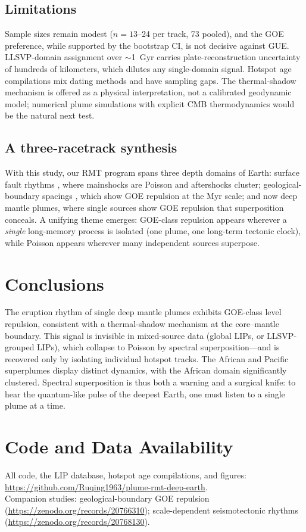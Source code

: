 \documentclass[12pt,a4paper]{article}
\begin{document}
\subsection{Limitations}
Sample sizes remain modest ($n=13$--24 per track, 73 pooled), and the GOE preference, while supported by the bootstrap CI, is not decisive against GUE. LLSVP-domain assignment over $\sim$1~Gyr carries plate-reconstruction uncertainty of hundreds of kilometers, which dilutes any single-domain signal. Hotspot age compilations mix dating methods and have sampling gaps. The thermal-shadow mechanism is offered as a physical interpretation, not a calibrated geodynamic model; numerical plume simulations with explicit CMB thermodynamics would be the natural next test.

\subsection{A three-racetrack synthesis}
With this study, our RMT program spans three depth domains of Earth: surface fault rhythms \citep{chen2026fault}, where mainshocks are Poisson and aftershocks cluster; geological-boundary spacings \citep{chen2026geo}, which show GOE repulsion at the Myr scale; and now deep mantle plumes, where single sources show GOE repulsion that superposition conceals. A unifying theme emerges: GOE-class repulsion appears wherever a \emph{single} long-memory process is isolated (one plume, one long-term tectonic clock), while Poisson appears wherever many independent sources superpose.

\section{Conclusions}
The eruption rhythm of single deep mantle plumes exhibits GOE-class level repulsion, consistent with a thermal-shadow mechanism at the core--mantle boundary. This signal is invisible in mixed-source data (global LIPs, or LLSVP-grouped LIPs), which collapse to Poisson by spectral superposition---and is recovered only by isolating individual hotspot tracks. The African and Pacific superplumes display distinct dynamics, with the African domain significantly clustered. Spectral superposition is thus both a warning and a surgical knife: to hear the quantum-like pulse of the deepest Earth, one must listen to a single plume at a time.

\section*{Code and Data Availability}
All code, the LIP database, hotspot age compilations, and figures: \url{https://github.com/Ruqing1963/plume-rmt-deep-earth}.\\
Companion studies: geological-boundary GOE repulsion (\url{https://zenodo.org/records/20766310}); scale-dependent seismotectonic rhythms (\url{https://zenodo.org/records/20768130}).
\end{document}
